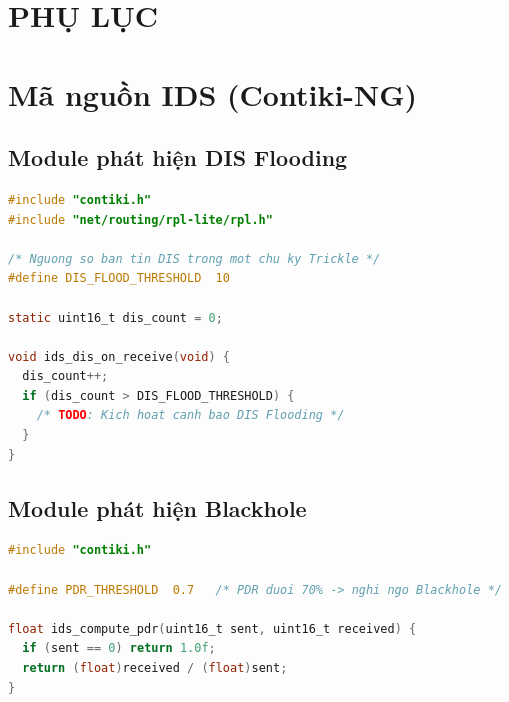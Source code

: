 \section*{PHỤ LỤC}
{}
\setcounter{section}{0}
\renewcommand{\thesection}{\Alph{section}}

\section{Mã nguồn IDS (Contiki-NG)}
\label{app:code}

\subsection{Module phát hiện DIS Flooding}

% 

\begin{lstlisting}[language=C, caption={Skeleton: ids\_dis\_flooding.c}]
#include "contiki.h"
#include "net/routing/rpl-lite/rpl.h"

/* Nguong so ban tin DIS trong mot chu ky Trickle */
#define DIS_FLOOD_THRESHOLD  10

static uint16_t dis_count = 0;

void ids_dis_on_receive(void) {
  dis_count++;
  if (dis_count > DIS_FLOOD_THRESHOLD) {
    /* TODO: Kich hoat canh bao DIS Flooding */
  }
}
\end{lstlisting}

\subsection{Module phát hiện Blackhole}

\begin{lstlisting}[language=C, caption={Skeleton: ids\_blackhole.c}]
#include "contiki.h"

#define PDR_THRESHOLD  0.7   /* PDR duoi 70% -> nghi ngo Blackhole */

float ids_compute_pdr(uint16_t sent, uint16_t received) {
  if (sent == 0) return 1.0f;
  return (float)received / (float)sent;
}
\end{lstlisting}

